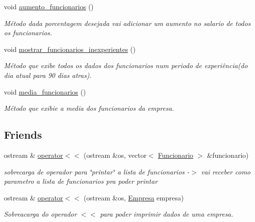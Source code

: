 \begin{DoxyCompactItemize}
\mbox{\label{classEmpresa_ab94695460926625bc144ff9f28f170c4}} 
void \hyperlink{classEmpresa_ab94695460926625bc144ff9f28f170c4}{aumento\+\_\+funcionarios} ()
\begin{DoxyCompactList}\small\item\em Método dada porcentagem desejada vai adicionar um aumento no salario de todos os funcionarios. \end{DoxyCompactList}\item 
\mbox{\label{classEmpresa_acba146817470ae3fc0cacf460c2586fe}} 
void \hyperlink{classEmpresa_acba146817470ae3fc0cacf460c2586fe}{mostrar\+\_\+funcionarios\+\_\+inexperientes} ()
\begin{DoxyCompactList}\small\item\em Método que exibe todos os dados dos funcionarios num periodo de experiência(do dia atual para 90 dias atras). \end{DoxyCompactList}\item 
\mbox{\label{classEmpresa_a1ce12337c48e08f6ef43e3aeb77135ac}} 
void \hyperlink{classEmpresa_a1ce12337c48e08f6ef43e3aeb77135ac}{media\+\_\+funcionarios} ()
\begin{DoxyCompactList}\small\item\em Método que exibie a media dos funcionarios da empresa. \end{DoxyCompactList}\end{DoxyCompactItemize}
\subsection*{Friends}
\begin{DoxyCompactItemize}
\item 
\mbox{\label{classEmpresa_a3b2fcbec8ee9978fc4df2b095fe9180e}} 
ostream \& \hyperlink{classEmpresa_a3b2fcbec8ee9978fc4df2b095fe9180e}{operator$<$$<$} (ostream \&os, vector$<$ \hyperlink{classFuncionario}{Funcionario} $>$ \&funcionario)
\begin{DoxyCompactList}\small\item\em sobrecarga de operador para \char`\"{}printar\char`\"{} a lista de funcionarios -\/$>$ vai receber como parametro a lista de funcionarios pra poder printar \end{DoxyCompactList}\item 
ostream \& \hyperlink{classEmpresa_a09889fd249bbf085dad71d637538359f}{operator$<$$<$} (ostream \&os, \hyperlink{classEmpresa}{Empresa} empresa)
\begin{DoxyCompactList}\small\item\em Sobreacarga do operador $<$$<$ para poder imprimir dados de uma empresa. \end{DoxyCompactList}\end{DoxyCompactItemize}


